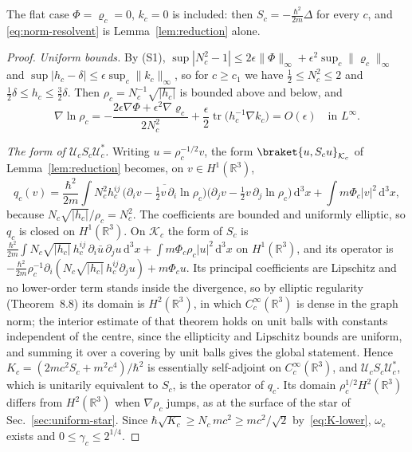 \documentclass[%
 aip,
 jmp,
 amsmath,amssymb,
 reprint, onecolumn
]{revtex4-1}
\theoremstyle{definition}
\theoremstyle{remark}
\newcommand{\R}{\mathbb{R}}
\newcommand{\K}{\mathcal{K}}
\newcommand{\rmd}{\mathrm{d}}
\begin{document}
The flat case $\Phi=\varrho_c=0$, $k_c=0$ is included: then
$S_c=-\frac{\hbar^2}{2m}\Delta$ for every $c$, and
\eqref{eq:norm-resolvent} is Lemma~\ref{lem:reduction} alone.

\begin{proof}
\emph{Uniform bounds.} By (S1), $\sup|N_c^2-1|\leq2\epsilon\|\Phi\|_\infty+
\epsilon^2\sup_c\|\varrho_c\|_\infty$ and $\sup|h_c-\delta|\leq\epsilon
\sup_c\|k_c\|_\infty$, so for $c\geq c_1$ we have $\frac12\leq N_c^2\leq2$ and
$\frac12\delta\leq h_c\leq\frac32\delta$. Then $\rho_c=N_c^{-1}
\sqrt{|h_c|}$ is bounded above and below, and
\[
\nabla\ln\rho_c=-\frac{2\epsilon\nabla\Phi+\epsilon^2\nabla\varrho_c}
{2N_c^2}+\frac{\epsilon}2\operatorname{tr}\bigl(h_c^{-1}\nabla k_c\bigr)
=O(\epsilon)\quad\text{in }L^\infty .
\]

\emph{The form of $\mathcal{U}_cS_c\mathcal{U}_c^*$.} Writing $u=
\rho_c^{-1/2}v$, the form $\braket{u,S_cu}_{\K_c}$ of
Lemma~\ref{lem:reduction} becomes, on $v\in H^1(\R^3)$,
\begin{equation}\label{eq:qc}
q_c(v)=\frac{\hbar^2}{2m}\int N_c^2h_c^{ij}\,
\overline{\bigl(\partial_iv-\tfrac12v\,\partial_i\ln\rho_c\bigr)}
\bigl(\partial_jv-\tfrac12v\,\partial_j\ln\rho_c\bigr)\,\rmd^3x
+\int m\Phi_c|v|^2\,\rmd^3x ,
\end{equation}
because $N_c\sqrt{|h_c|}/\rho_c=N_c^2$. The coefficients are bounded and
uniformly elliptic, so $q_c$ is closed on $H^1(\R^3)$. On $\K_c$ the form
of $S_c$ is $\frac{\hbar^2}{2m}\int N_c\sqrt{|h_c|}\,h_c^{ij}\,\partial_i
\bar u\,\partial_ju\,\rmd^3x+\int m\Phi_c\rho_c|u|^2\,\rmd^3x$ on
$H^1(\R^3)$, and its operator is $-\frac{\hbar^2}{2m}\rho_c^{-1}\partial_i
(N_c\sqrt{|h_c|}\,h_c^{ij}\partial_ju)+m\Phi_cu$. Its principal
coefficients are Lipschitz and no lower-order term stands inside the
divergence, so by elliptic regularity~\cite{GilbargTrudinger2001}
(Theorem~8.8) its domain is $H^2(\R^3)$, in which $C_c^\infty(\R^3)$ is
dense in the graph norm; the interior estimate of that theorem holds on
unit balls with constants independent of the centre, since the
ellipticity and Lipschitz bounds are uniform, and summing it over a
covering by unit balls gives the global statement. Hence $K_c=(2mc^2S_c+m^2c^4)/\hbar^2$ is
essentially self-adjoint on $C_c^\infty(\R^3)$, and $\mathcal{U}_cS_c
\mathcal{U}_c^*$, which is unitarily equivalent to $S_c$, is the operator
of $q_c$. Its domain $\rho_c^{1/2}H^2(\R^3)$ differs from $H^2(\R^3)$ when
$\nabla\rho_c$ jumps, as at the surface of the star of
Sec.~\ref{sec:uniform-star}. Since $\hbar\sqrt{K_c}\geq N_c\,mc^2\geq mc^2/\sqrt2$
by~\eqref{eq:K-lower}, $\omega_c$ exists and $0\leq\gamma_c\leq2^{1/4}$.


\end{proof}
\end{document}
